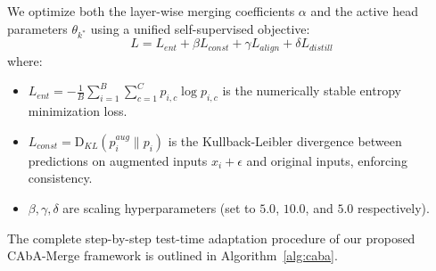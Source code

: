 \documentclass{article}
\theoremstyle{plain}
\theoremstyle{definition}
\theoremstyle{remark}
\begin{document}
We optimize both the layer-wise merging coefficients $\alpha$ and the active head parameters $\theta_{k^*}$ using a unified self-supervised objective:
\begin{equation}
    L = L_{ent} + \beta L_{const} + \gamma L_{align} + \delta L_{distill}
\end{equation}
where:
\begin{itemize}
    \item $L_{ent} = -\frac{1}{B} \sum_{i=1}^B \sum_{c=1}^C p_{i, c} \log p_{i, c}$ is the numerically stable entropy minimization loss.
    \item $L_{const} = \text{D}_{KL}(p_i^{aug} \parallel p_i)$ is the Kullback-Leibler divergence between predictions on augmented inputs $x_i + \epsilon$ and original inputs, enforcing consistency.
    \item $\beta, \gamma, \delta$ are scaling hyperparameters (set to $5.0$, $10.0$, and $5.0$ respectively).
\end{itemize}

The complete step-by-step test-time adaptation procedure of our proposed CAbA-Merge framework is outlined in Algorithm~\ref{alg:caba}.
\end{document}
